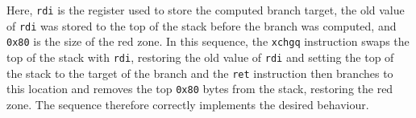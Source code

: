 Here, \texttt{rdi} is the register used to store the computed branch
target, the old value of \texttt{rdi} was stored to the top of the
stack before the branch was computed, and \texttt{0x80} is the size of
the red zone.  In this sequence, the \texttt{xchgq} instruction swaps
the top of the stack with \texttt{rdi}, restoring the old value of
\texttt{rdi} and setting the top of the stack to the target of the
branch and the \texttt{ret} instruction then branches to this location
and removes the top \texttt{0x80} bytes from the stack, restoring the
red zone.  The sequence therefore correctly implements the desired
behaviour.




